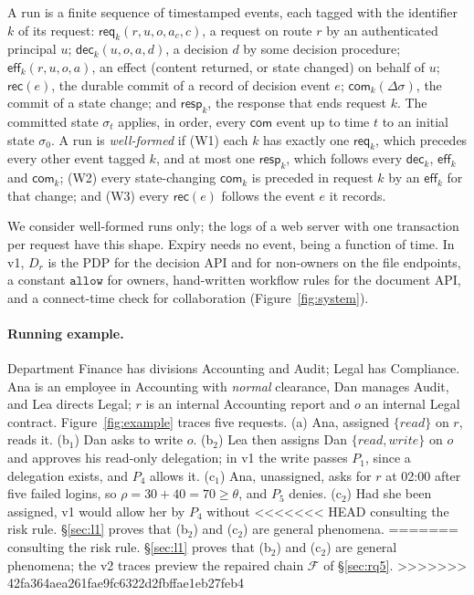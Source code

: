 \documentclass[sigconf,review,anonymous]{acmart}
\newcommand{\allowv}{\mathtt{allow}}
\newcommand{\ev}[1]{\mathsf{#1}}
\begin{document}
\begin{definition}[Runs]\label{def:runs}
A run is a finite sequence of timestamped events, each tagged with the identifier $k$ of its request:
$\ev{req}_k(r,u,o,a_c,c)$, a request on route $r$ by an authenticated principal $u$; $\ev{dec}_k(u,o,a,d)$, a
decision $d$ by some decision procedure; $\ev{eff}_k(r,u,o,a)$, an effect (content returned, or state changed) on
behalf of $u$; $\ev{rec}(e)$, the durable commit of a record of decision event $e$; $\ev{com}_k(\Delta\sigma)$, the
commit of a state change; and $\ev{resp}_k$, the response that ends request $k$. The committed state $\sigma_t$
applies, in order, every $\ev{com}$ event up to time $t$ to an initial state $\sigma_0$. A run is
\emph{well-formed} if (W1) each $k$ has exactly one $\ev{req}_k$, which precedes every other event tagged $k$, and
at most one $\ev{resp}_k$, which follows every $\ev{dec}_k$, $\ev{eff}_k$ and $\ev{com}_k$; (W2) every
state-changing $\ev{com}_k$ is preceded in request $k$ by an $\ev{eff}_k$ for that change; and (W3) every
$\ev{rec}(e)$ follows the event $e$ it records.
\end{definition}

We consider well-formed runs only; the logs of a web server with one transaction per request have this shape.
Expiry needs no event, being a function of time. In v1, $D_r$ is the PDP for the decision API and for non-owners on
the file endpoints, a constant $\allowv$ for owners, hand-written workflow rules for the document API, and a
connect-time check for collaboration (Figure~\ref{fig:system}).

\paragraph{Running example.} Department Finance has divisions Accounting and Audit; Legal has Compliance. Ana is an
employee in Accounting with \emph{normal} clearance, Dan manages Audit, and Lea directs Legal; $r$ is an internal
Accounting report and $o$ an internal Legal contract. Figure~\ref{fig:example} traces five requests. (a) Ana,
assigned $\{\mathit{read}\}$ on $r$, reads it. (b$_1$) Dan asks to write $o$. (b$_2$) Lea then assigns Dan
$\{\mathit{read},\mathit{write}\}$ on $o$ and approves his read-only delegation; in v1 the write passes $P_1$, since
a delegation exists, and $P_4$ allows it. (c$_1$) Ana, unassigned, asks for $r$ at 02:00 after five failed logins,
so $\rho=30+40=70\ge\theta$, and $P_5$ denies. (c$_2$) Had she been assigned, v1 would allow her by $P_4$ without
<<<<<<< HEAD
consulting the risk rule. \S\ref{sec:l1} proves that (b$_2$) and (c$_2$) are general phenomena.
=======
consulting the risk rule. \S\ref{sec:l1} proves that (b$_2$) and (c$_2$) are general phenomena; the v2 traces preview
the repaired chain $\mathcal{F}$ of \S\ref{sec:rq5}.
>>>>>>> 42fa364aea261fae9fc6322d2fbffae1eb27feb4
\end{document}
